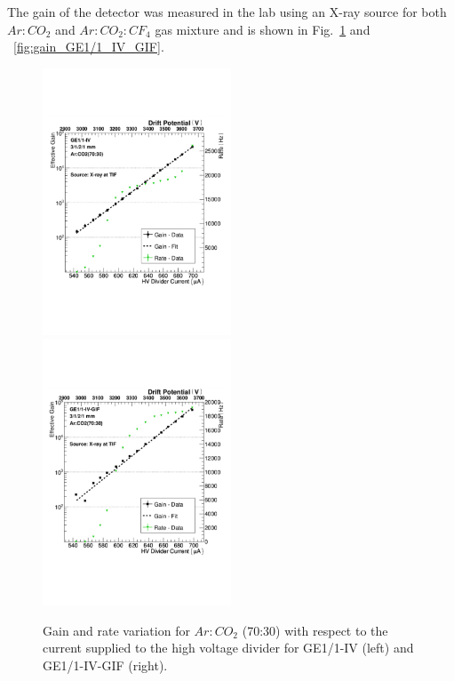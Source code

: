 The gain of the detector was measured in the lab using an X-ray source for both $Ar:CO_2$ and $Ar:CO_2:CF_4$ gas mixture and is shown in Fig.~\ref{fig:gain_GE1/1_IV} and ~\ref{fig:gain_GE1/1_IV_GIF}.
\begin{figure}[!htbp]
    \centering
    \includegraphics[width=0.5\textwidth]{figures/GEM/Gain_curve_GE11_IV_Ar_CO2.pdf}%
    \includegraphics[width=0.5\textwidth]{figures/GEM/Gain_curve_GE11_IV_GIF_Ar_CO2.pdf}
    \caption{Gain and rate variation for $Ar:CO_2$ (70:30) with respect to the current supplied to the high voltage divider for GE1/1-IV (left) and GE1/1-IV-GIF (right).}
    \label{fig:gain_GE1/1_IV}
\end{figure}

